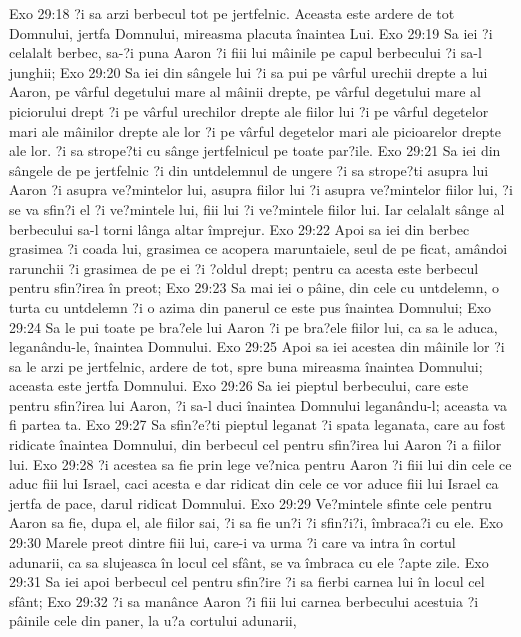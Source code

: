 Exo 29:18  ?i sa arzi berbecul tot pe jertfelnic. Aceasta este ardere de tot Domnului, jertfa Domnului, mireasma placuta înaintea Lui.
Exo 29:19  Sa iei ?i celalalt berbec, sa-?i puna Aaron ?i fiii lui mâinile pe capul berbecului ?i sa-l junghii;
Exo 29:20  Sa iei din sângele lui ?i sa pui pe vârful urechii drepte a lui Aaron, pe vârful degetului mare al mâinii drepte, pe vârful degetului mare al piciorului drept ?i pe vârful urechilor drepte ale fiilor lui ?i pe vârful degetelor mari ale mâinilor drepte ale lor ?i pe vârful degetelor mari ale picioarelor drepte ale lor. ?i sa strope?ti cu sânge jertfelnicul pe toate par?ile.
Exo 29:21  Sa iei din sângele de pe jertfelnic ?i din untdelemnul de ungere ?i sa strope?ti asupra lui Aaron ?i asupra ve?mintelor lui, asupra fiilor lui ?i asupra ve?mintelor fiilor lui, ?i se va sfin?i el ?i ve?mintele lui, fiii lui ?i ve?mintele fiilor lui. Iar celalalt sânge al berbecului sa-l torni lânga altar împrejur.
Exo 29:22  Apoi sa iei din berbec grasimea ?i coada lui, grasimea ce acopera maruntaiele, seul de pe ficat, amândoi rarunchii ?i grasimea de pe ei ?i ?oldul drept; pentru ca acesta este berbecul pentru sfin?irea în preot;
Exo 29:23  Sa mai iei o pâine, din cele cu untdelemn, o turta cu untdelemn ?i o azima din panerul ce este pus înaintea Domnului;
Exo 29:24  Sa le pui toate pe bra?ele lui Aaron ?i pe bra?ele fiilor lui, ca sa le aduca, leganându-le, înaintea Domnului.
Exo 29:25  Apoi sa iei acestea din mâinile lor ?i sa le arzi pe jertfelnic, ardere de tot, spre buna mireasma înaintea Domnului; aceasta este jertfa Domnului.
Exo 29:26  Sa iei pieptul berbecului, care este pentru sfin?irea lui Aaron, ?i sa-l duci înaintea Domnului leganându-l; aceasta va fi partea ta.
Exo 29:27  Sa sfin?e?ti pieptul leganat ?i spata leganata, care au fost ridicate înaintea Domnului, din berbecul cel pentru sfin?irea lui Aaron ?i a fiilor lui.
Exo 29:28  ?i acestea sa fie prin lege ve?nica pentru Aaron ?i fiii lui din cele ce aduc fiii lui Israel, caci acesta e dar ridicat din cele ce vor aduce fiii lui Israel ca jertfa de pace, darul ridicat Domnului.
Exo 29:29  Ve?mintele sfinte cele pentru Aaron sa fie, dupa el, ale fiilor sai, ?i sa fie un?i ?i sfin?i?i, îmbraca?i cu ele.
Exo 29:30  Marele preot dintre fiii lui, care-i va urma ?i care va intra în cortul adunarii, ca sa slujeasca în locul cel sfânt, se va îmbraca cu ele ?apte zile.
Exo 29:31  Sa iei apoi berbecul cel pentru sfin?ire ?i sa fierbi carnea lui în locul cel sfânt;
Exo 29:32  ?i sa manânce Aaron ?i fiii lui carnea berbecului acestuia ?i pâinile cele din paner, la u?a cortului adunarii,
